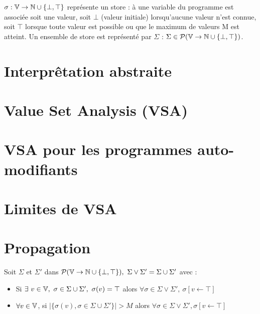 
\begin{defi}
$\sigma : \mathbb V \rightarrow \mathbb N\cup\{\bot,\top\}$ représente un store : à une variable du programme est associée soit une valeur, soit $\bot$ (valeur initiale) lorsqu'aucune valeur n'est connue, soit $\top$ lorsque toute valeur est possible ou que le maximum de valeurs M est atteint. Un ensemble de store est représenté par $\Sigma$ : $\Sigma\in\mathcal P(\mathbb V\rightarrow\mathbb N\cup\{\bot,\top\})$.\\
\end{defi}


\section{Interprêtation abstraite}
\section{Value Set Analysis (VSA)}

\section{VSA pour les programmes auto-modifiants}


\section{Limites de VSA}

\section{Propagation}
\begin{defi}
Soit $\Sigma$ et $\Sigma'$ dans $\mathcal P(\mathbb V\rightarrow\mathbb N\cup\{\bot,\top\}),\ \Sigma \vee \Sigma'=\Sigma \cup \Sigma'$ avec : 
\begin{itemize}
 \item Si $\exists\ v\in\BV,\ \sigma\in\Sigma\cup\Sigma',\ \sigma(v)=\top$ alors $\forall\sigma\in\Sigma\vee\Sigma',\ \sigma[v\leftarrow\top]$
 \item $\forall v\in\mathbb V$, si $|\{\sigma(v), \sigma\in\Sigma\cup\Sigma'\}|>M$ alors $\forall\sigma\in\Sigma\vee\Sigma',\sigma[v\leftarrow\top]$
\end{itemize}
\end{defi}

